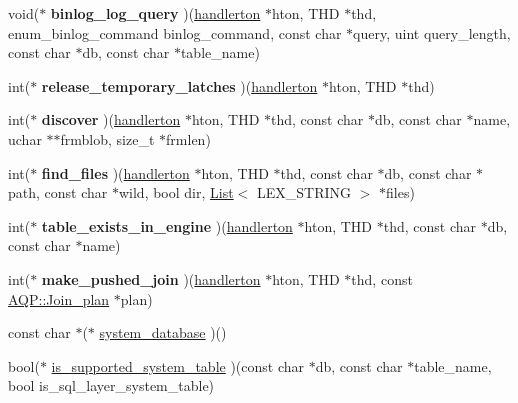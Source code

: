 \begin{DoxyCompactItemize}
\item 
\mbox{\label{structhandlerton_a786490c92831158695b854b85af12ecd}} 
void($\ast$ {\bfseries binlog\+\_\+log\+\_\+query} )(\mbox{\hyperlink{structhandlerton}{handlerton}} $\ast$hton, T\+HD $\ast$thd, enum\+\_\+binlog\+\_\+command binlog\+\_\+command, const char $\ast$query, uint query\+\_\+length, const char $\ast$db, const char $\ast$table\+\_\+name)
\item 
\mbox{\label{structhandlerton_ab4f8cf79ec942e1b9f2fac1d5b40a7d3}} 
int($\ast$ {\bfseries release\+\_\+temporary\+\_\+latches} )(\mbox{\hyperlink{structhandlerton}{handlerton}} $\ast$hton, T\+HD $\ast$thd)
\item 
\mbox{\label{structhandlerton_a4214f627f24daae358e4bff0c54c5fad}} 
int($\ast$ {\bfseries discover} )(\mbox{\hyperlink{structhandlerton}{handlerton}} $\ast$hton, T\+HD $\ast$thd, const char $\ast$db, const char $\ast$name, uchar $\ast$$\ast$frmblob, size\+\_\+t $\ast$frmlen)
\item 
\mbox{\label{structhandlerton_a0afa76e2414199e1829b6c8cac2b3a13}} 
int($\ast$ {\bfseries find\+\_\+files} )(\mbox{\hyperlink{structhandlerton}{handlerton}} $\ast$hton, T\+HD $\ast$thd, const char $\ast$db, const char $\ast$path, const char $\ast$wild, bool dir, \mbox{\hyperlink{classList}{List}}$<$ L\+E\+X\+\_\+\+S\+T\+R\+I\+NG $>$ $\ast$files)
\item 
\mbox{\label{structhandlerton_ac3cfb4acd4e060c0405a6b1c463e9f7f}} 
int($\ast$ {\bfseries table\+\_\+exists\+\_\+in\+\_\+engine} )(\mbox{\hyperlink{structhandlerton}{handlerton}} $\ast$hton, T\+HD $\ast$thd, const char $\ast$db, const char $\ast$name)
\item 
\mbox{\label{structhandlerton_ade5f1ce0077cb1e2a7aa4fc300ad6532}} 
int($\ast$ {\bfseries make\+\_\+pushed\+\_\+join} )(\mbox{\hyperlink{structhandlerton}{handlerton}} $\ast$hton, T\+HD $\ast$thd, const \mbox{\hyperlink{classAQP_1_1Join__plan}{A\+Q\+P\+::\+Join\+\_\+plan}} $\ast$plan)
\item 
const char $\ast$($\ast$ \mbox{\hyperlink{structhandlerton_a8d533d8e4139d4385e9d2e2171985447}{system\+\_\+database}} )()
\item 
bool($\ast$ \mbox{\hyperlink{structhandlerton_af292121e11f7e92ab52a11751467e9ad}{is\+\_\+supported\+\_\+system\+\_\+table}} )(const char $\ast$db, const char $\ast$table\+\_\+name, bool is\+\_\+sql\+\_\+layer\+\_\+system\+\_\+table)
$$
\end{DoxyCompactItemize}
